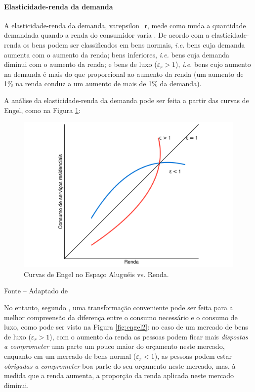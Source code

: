 \documentclass[
	12pt,				%
	oneside,			%
	a4paper,			%
	chapter=TITLE,		%
	section=TITLE,		%
	english,			%
	brazil				%
	]{abntex2}
\newcommand{\bcenter}{\begin{center}}
\newcommand{\ecenter}{\end{center}}
\begin{document}
\begin{refsection}
\hypertarget{elasticidade-renda-da-demanda}{%
\paragraph{Elasticidade-renda da demanda}\label{elasticidade-renda-da-demanda}}

A elasticidade-renda da demanda, \gls{varepsilon_r}, mede como muda a quantidade
demandada quando a renda do consumidor varia \autocite[p.300]{varian}. De acordo com a
elasticidade-renda os bens podem ser classificados em bens normais, \emph{i.e.} bens
cuja demanda aumenta com o aumento da renda; bens inferiores, \emph{i.e.} bens cuja
demanda diminui com o aumento da renda; e bens de luxo (\(\varepsilon_r > 1\)),
\emph{i.e.} bens cujo aumento na demanda é mais do que proporcional ao aumento da
renda (um aumento de 1\% na renda conduz a um aumento de mais de 1\% da demanda).

A análise da elasticidade-renda da demanda pode ser feita a partir das curvas
de Engel, como na Figura \ref{fig:engel1}:
\begin{figure}[H]

{\centering \includegraphics[width=0.7\linewidth]{images/engel1-1} 

}

\caption{Curvas de Engel no Espaço Aluguéis vs. Renda.}\label{fig:engel1}
\end{figure}
\bcenter

\small Fonte -- Adaptado de \textcite[p.~12]{regulation}
\ecenter

No entanto, segundo \textcite[p.~12-13]{regulation}, uma transformação conveniente pode
ser feita para a melhor compreensão da diferença entre o consumo necessário e o
consumo de luxo, como pode ser visto na Figura \ref{fig:engel2}: no caso de um
mercado de bens de luxo (\(\varepsilon_r > 1\)), com o aumento da renda as pessoas
podem ficar mais \emph{dispostas a comprometer} uma parte um pouco maior do orçamento
neste mercado, enquanto em um mercado de bens normal (\(\varepsilon_r < 1\)), as
pessoas podem estar \emph{obrigadas a comprometer} boa parte do seu orçamento neste
mercado, mas, à medida que a renda aumenta, a proporção da renda aplicada neste
mercado diminui.
\begin{figure}[H]


\end{figure}
\end{refsection}
\end{document}

